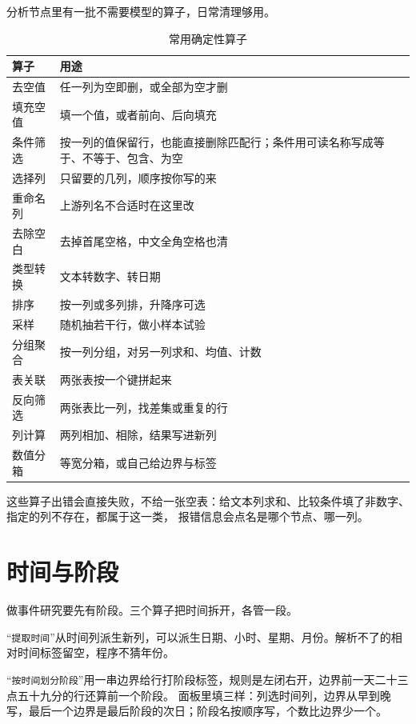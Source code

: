 分析节点里有一批不需要模型的算子，日常清理够用。

\begin{table}[H]\centering
\caption{常用确定性算子}
\label{tab:ops}
\small
\begin{tabularx}{\textwidth}{p{3.2cm}X}
\toprule
算子 & 用途 \\
\midrule
去空值 & 任一列为空即删，或全部为空才删 \\
填充空值 & 填一个值，或者前向、后向填充 \\
条件筛选 & 按一列的值保留行，也能直接删除匹配行；条件用可读名称写成等于、不等于、包含、为空 \\
选择列 & 只留要的几列，顺序按你写的来 \\
重命名列 & 上游列名不合适时在这里改 \\
去除空白 & 去掉首尾空格，中文全角空格也清 \\
类型转换 & 文本转数字、转日期 \\
排序 & 按一列或多列排，升降序可选 \\
采样 & 随机抽若干行，做小样本试验 \\
分组聚合 & 按一列分组，对另一列求和、均值、计数 \\
表关联 & 两张表按一个键拼起来 \\
反向筛选 & 两张表比一列，找差集或重复的行 \\
列计算 & 两列相加、相除，结果写进新列 \\
数值分箱 & 等宽分箱，或自己给边界与标签 \\
\bottomrule
\end{tabularx}
\end{table}

这些算子出错会直接失败，不给一张空表：给文本列求和、比较条件填了非数字、指定的列不存在，都属于这一类，
报错信息会点名是哪个节点、哪一列。

\section{时间与阶段}

做事件研究要先有阶段。三个算子把时间拆开，各管一段。

“\texttt{提取时间}”从时间列派生新列，可以派生日期、小时、星期、月份。解析不了的相对时间标签留空，程序不猜年份。

“\texttt{按时间划分阶段}”用一串边界给行打阶段标签，规则是左闭右开，边界前一天二十三点五十九分的行还算前一个阶段。
面板里填三样：列选时间列，边界从早到晚写，最后一个边界是最后阶段的次日；阶段名按顺序写，个数比边界少一个。

